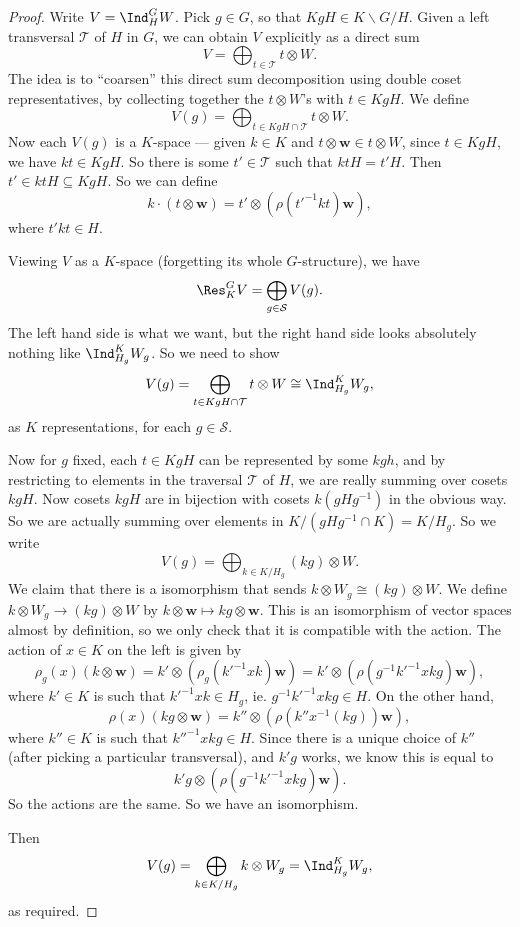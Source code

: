 \documentclass[a4paper]{article}
\begin{document}
\begin{proof}
  Write $V = \Ind_H^G W$. Pick $g \in G$, so that $KgH \in K \backslash G / H$. Given a left transversal $\mathcal{T}$ of $H$ in $G$, we can obtain $V$ explicitly as a direct sum
  \[
    V = \bigoplus_{t \in \mathcal{T}} t\otimes W.
  \]
  The idea is to ``coarsen'' this direct sum decomposition using double coset representatives, by collecting together the $t\otimes W$'s with $t \in KgH$. We define
  \[
    V(g) = \bigoplus_{t \in KgH \cap \mathcal{T}} t\otimes W.
  \]
  Now each $V(g)$ is a $K$-space --- given $k \in K$ and $t \otimes \mathbf{w} \in t \otimes W$, since $t \in KgH$, we have $kt \in KgH$. So there is some $t' \in \mathcal{T}$ such that $ktH = t' H$. Then $t' \in ktH \subseteq KgH$. So we can define
  \[
    k \cdot (t \otimes \mathbf{w}) = t' \otimes (\rho(t'^{-1} kt) \mathbf{w}),
  \]
  where $t'kt \in H$.

  Viewing $V$ as a $K$-space (forgetting its whole $G$-structure), we have
  \[
    \Res_K^G V = \bigoplus_{g \in \mathcal{S}} V(g).
  \]
  The left hand side is what we want, but the right hand side looks absolutely nothing like $\Ind_{H_g}^K W_g$. So we need to show
  \[
    V(g) = \bigoplus_{t \in KgH \cap \mathcal{T}} t\otimes W \cong \Ind_{H_g}^K W_g,
  \]
  as $K$ representations, for each $g \in \mathcal{S}$.

  Now for $g$ fixed, each $t \in KgH$ can be represented by some $kgh$, and by restricting to elements in the traversal $\mathcal{T}$ of $H$, we are really summing over cosets $kgH$. Now cosets $kgH$ are in bijection with cosets $k(gHg^{-1})$ in the obvious way. So we are actually summing over elements in $K/(gHg^{-1} \cap K) = K/H_g$. So we write
  \[
    V(g) = \bigoplus_{k \in K/H_g} (kg)\otimes W.
  \]
  We claim that there is a isomorphism that sends $k \otimes W_g \cong (kg) \otimes W$. We define $k \otimes W_g \to (kg) \otimes W$ by $k \otimes \mathbf{w} \mapsto kg \otimes \mathbf{w}$. This is an isomorphism of vector spaces almost by definition, so we only check that it is compatible with the action. The action of $x \in K$ on the left is given by
  \[
    \rho_g(x) (k \otimes \mathbf{w}) = k' \otimes (\rho_g(k'^{-1} xk) \mathbf{w}) = k' \otimes (\rho(g^{-1} k'^{-1} xkg) \mathbf{w}),
  \]
  where $k' \in K$ is such that $k'^{-1} xk \in H_g$, ie. $g^{-1} k'^{-1} xkg \in H$. On the other hand,
  \[
    \rho(x) (kg \otimes \mathbf{w}) = k'' \otimes (\rho (k'' x^{-1} (kg)) \mathbf{w}),
  \]
  where $k'' \in K$ is such that $k''^{-1} xkg \in H$. Since there is a unique choice of $k''$ (after picking a particular transversal), and $k' g$ works, we know this is equal to
  \[
    k' g \otimes (\rho(g^{-1} k'^{-1} xkg) \mathbf{w}).
  \]
  So the actions are the same. So we have an isomorphism.

  Then
  \[
    V(g) = \bigoplus_{k \in K/H_g} k \otimes W_g = \Ind_{H_g}^K W_g,
  \]
  as required.
\end{proof}
\end{document}
